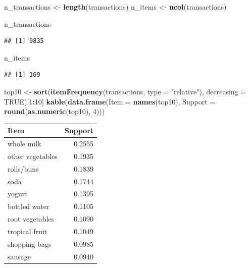 \documentclass[
]{article}
\newenvironment{Shaded}{\begin{snugshade}}{\end{snugshade}}
\newcommand{\AttributeTok}[1]{\textcolor[rgb]{0.13,0.29,0.53}{#1}}
\newcommand{\ConstantTok}[1]{\textcolor[rgb]{0.56,0.35,0.01}{#1}}
\newcommand{\DecValTok}[1]{\textcolor[rgb]{0.00,0.00,0.81}{#1}}
\newcommand{\FunctionTok}[1]{\textcolor[rgb]{0.13,0.29,0.53}{\textbf{#1}}}
\newcommand{\NormalTok}[1]{#1}
\newcommand{\OtherTok}[1]{\textcolor[rgb]{0.56,0.35,0.01}{#1}}
\newcommand{\SpecialCharTok}[1]{\textcolor[rgb]{0.81,0.36,0.00}{\textbf{#1}}}
\newcommand{\StringTok}[1]{\textcolor[rgb]{0.31,0.60,0.02}{#1}}
\newcounter{none} %
\begin{document}
\begin{Shaded}
\begin{Highlighting}[]
\NormalTok{n\_transactions }\OtherTok{\textless{}{-}} \FunctionTok{length}\NormalTok{(transactions)}
\NormalTok{n\_items }\OtherTok{\textless{}{-}} \FunctionTok{ncol}\NormalTok{(transactions)}

\NormalTok{n\_transactions}
\end{Highlighting}
\end{Shaded}

\begin{verbatim}
## [1] 9835
\end{verbatim}

\begin{Shaded}
\begin{Highlighting}[]
\NormalTok{n\_items}
\end{Highlighting}
\end{Shaded}

\begin{verbatim}
## [1] 169
\end{verbatim}

\begin{Shaded}
\begin{Highlighting}[]
\NormalTok{top10 }\OtherTok{\textless{}{-}} \FunctionTok{sort}\NormalTok{(}\FunctionTok{itemFrequency}\NormalTok{(transactions, }\AttributeTok{type =} \StringTok{"relative"}\NormalTok{), }\AttributeTok{decreasing =} \ConstantTok{TRUE}\NormalTok{)[}\DecValTok{1}\SpecialCharTok{:}\DecValTok{10}\NormalTok{]}
\FunctionTok{kable}\NormalTok{(}\FunctionTok{data.frame}\NormalTok{(}\AttributeTok{Item =} \FunctionTok{names}\NormalTok{(top10), }\AttributeTok{Support =} \FunctionTok{round}\NormalTok{(}\FunctionTok{as.numeric}\NormalTok{(top10), }\DecValTok{4}\NormalTok{)))}
\end{Highlighting}
\end{Shaded}

{\def\LTcaptype{none} %
\begin{longtable}[]{@{}lr@{}}
\toprule\noalign{}
Item & Support \\
\midrule\noalign{}
\endhead
\bottomrule\noalign{}
\endlastfoot
whole milk & 0.2555 \\
other vegetables & 0.1935 \\
rolls/buns & 0.1839 \\
soda & 0.1744 \\
yogurt & 0.1395 \\
bottled water & 0.1105 \\
root vegetables & 0.1090 \\
tropical fruit & 0.1049 \\
shopping bags & 0.0985 \\
sausage & 0.0940 \\
\end{longtable}
}
\end{document}
